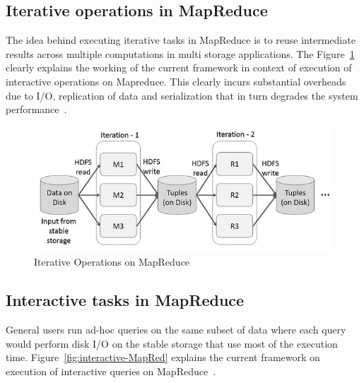 \subsection{Iterative operations in MapReduce}

The idea behind executing iterative tasks in MapReduce is to reuse intermediate 
results across multiple computations in multi storage applications. 
The Figure~\ref{fig:iterative-MapRed} clearly explains the working of the  
current framework in context of execution of interactive operations on 
Mapreduce. This clearly incurs substantial overheads due to I/O, replication of 
data and serialization that in turn degrades the system performance~\cite{hid-sp18-410-spark-RDD}. 



\begin{figure}[!ht]
  \centering\includegraphics[width=\columnwidth]{images/iterative-MapReduce.png}
   \caption{Iterative Operations on MapReduce 
   ~\cite{hid-sp18-410-spark-RDD}}\label{fig:iterative-MapRed}
\end{figure}









\subsection{Interactive tasks in MapReduce}

General users run ad-hoc queries on the same subset of data where each query 
would perform disk I/O on the stable storage that use most of the execution time.
Figure~\ref{fig:interactive-MapRed} explains the current framework on execution 
of interactive queries on MapReduce~\cite{hid-sp18-410-spark-RDD}.

